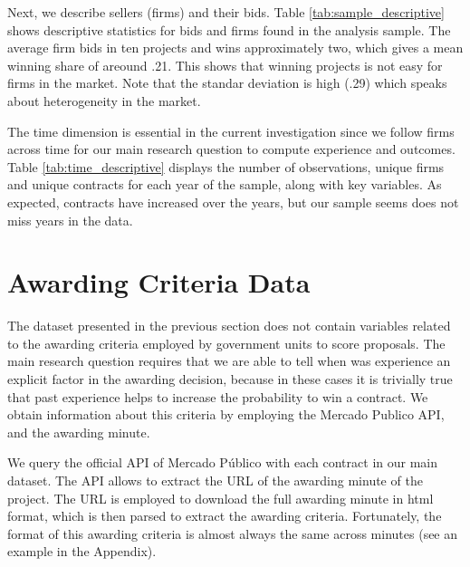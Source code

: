 Next, we describe sellers (firms) and their bids. Table \ref{tab:sample_descriptive} shows descriptive statistics for bids and firms found in the analysis sample. The average firm bids in ten projects and wins approximately two, which gives a mean winning share of areound .21. This shows that winning projects is not easy for firms in the market. Note that the standar deviation is high (.29) which speaks about heterogeneity in the market.



The time dimension is essential in the current investigation since we follow firms across time for our main research question to compute experience and outcomes. Table \ref{tab:time_descriptive} displays the number of observations, unique firms and unique contracts for each year of the sample, along with key variables. As expected, contracts have increased over the years, but our sample seems does not miss years in the data.





\section{Awarding Criteria Data}
The dataset presented in the previous section does not contain variables related to the awarding criteria employed by government units to score proposals. The main research question requires that we are able to tell when was experience an explicit factor in the awarding decision, because in these cases it is trivially true that past experience helps to increase the probability to win a contract. We obtain information about this criteria by employing the Mercado Publico API, and the awarding minute.

We query the official API of Mercado Público with each contract in our main dataset. The API allows to extract the URL of the awarding minute of the project. The URL is employed to download the full awarding minute in html format, which is then parsed to extract the awarding criteria. Fortunately, the format of this awarding criteria is almost always the same across minutes (see an example in the Appendix).

